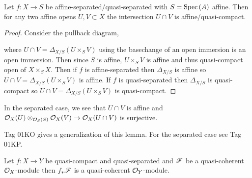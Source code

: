 \documentclass[12pt]{article}
\begin{document}
\begin{lemma}
Let $f : X \to S$ be affine-separated/quasi-separated with $S = \mathrm{Spec}\left( A \right)$ affine. Then for any two affine opens $U, V \subset X$ the intersection $U \cap V$ is affine/quasi-compact. 
\end{lemma}

\begin{proof}
Consider the pullback diagram,
\begin{center}
\end{center}
where $U \cap V = \Delta_{X/S}(U \times_S V)$ using the basechange of an open immersion is an open immersion. Then since $S$ is affine, $U \times_S V$ is affine and thus quasi-compact open of $X \times_S X$. Then if $f$ is affine-separated then $\Delta_{X/S}$ is affine so $U \cap V = \Delta_{X/S}(U \times_S V)$ is affine. If $f$ is quasi-separated then $\Delta_{X/S}$ is quasi-compact so $U \cap V = \Delta_{X/S}(U \times_S V)$ is quasi-compact.
\end{proof}

\begin{rmk}
In the separated case, we see that $U \cap V$ is affine and $\mathcal{O}_{X}(U) \otimes_{\mathcal{O}_{S}(S)} \mathcal{O}_{X}(V) \to \mathcal{O}_{X}(U \cap V)$ is surjective.
\end{rmk}

\begin{rmk}
Tag 01KO gives a generalization of this lemma. For the separated case see Tag 01KP.
\end{rmk}

\begin{lemma}
Let $f : X \to Y$ be quasi-compact and quasi-separated and $\mathscr{F}$ be a quasi-coherent $\mathcal{O}_{X}$-module then $f_* \mathscr{F}$ is a quasi-coherent $\mathcal{O}_{Y}$-module.
\end{lemma}
\end{document}
